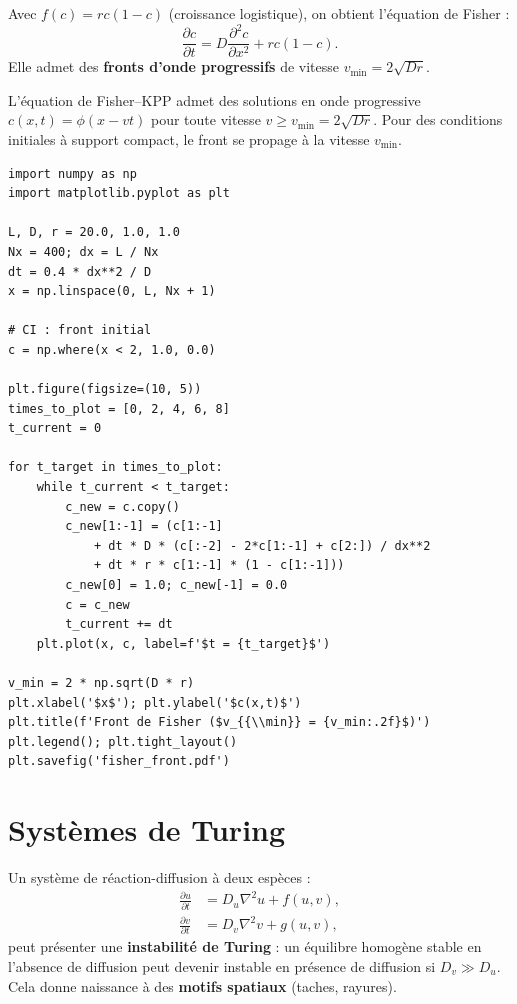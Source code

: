 \begin{exemple}
Avec $f(c)=rc(1-c)$ (croissance logistique), on obtient l'\'equation
de Fisher :
\[
  \frac{\partial c}{\partial t} = D\frac{\partial^2 c}{\partial x^2}
  + rc(1-c).
\]
Elle admet des \textbf{fronts d'onde progressifs} de vitesse
$v_{\min}=2\sqrt{Dr}$.
\end{exemple}

\begin{theoreme}
L'\'equation de Fisher--KPP admet des solutions en onde progressive
$c(x,t)=\phi(x-vt)$ pour toute vitesse $v\geq v_{\min}=2\sqrt{Dr}$.
Pour des conditions initiales \`a support compact, le front se propage
\`a la vitesse $v_{\min}$.
\end{theoreme}

\begin{codeblock}[title=\textbf{Front d'onde de Fisher}]
\begin{verbatim}
import numpy as np
import matplotlib.pyplot as plt

L, D, r = 20.0, 1.0, 1.0
Nx = 400; dx = L / Nx
dt = 0.4 * dx**2 / D
x = np.linspace(0, L, Nx + 1)

# CI : front initial
c = np.where(x < 2, 1.0, 0.0)

plt.figure(figsize=(10, 5))
times_to_plot = [0, 2, 4, 6, 8]
t_current = 0

for t_target in times_to_plot:
    while t_current < t_target:
        c_new = c.copy()
        c_new[1:-1] = (c[1:-1]
            + dt * D * (c[:-2] - 2*c[1:-1] + c[2:]) / dx**2
            + dt * r * c[1:-1] * (1 - c[1:-1]))
        c_new[0] = 1.0; c_new[-1] = 0.0
        c = c_new
        t_current += dt
    plt.plot(x, c, label=f'$t = {t_target}$')

v_min = 2 * np.sqrt(D * r)
plt.xlabel('$x$'); plt.ylabel('$c(x,t)$')
plt.title(f'Front de Fisher ($v_{{\\min}} = {v_min:.2f}$)')
plt.legend(); plt.tight_layout()
plt.savefig('fisher_front.pdf')
\end{verbatim}
\end{codeblock}

\section{Syst\`emes de Turing}

\begin{definition}
Un syst\`eme de r\'eaction-diffusion \`a deux esp\`eces :
\begin{align}
  \frac{\partial u}{\partial t} &= D_u\nabla^2 u + f(u,v), \\
  \frac{\partial v}{\partial t} &= D_v\nabla^2 v + g(u,v),
\end{align}
peut pr\'esenter une \textbf{instabilit\'e de Turing} : un \'equilibre
homog\`ene stable en l'absence de diffusion peut devenir instable en
pr\'esence de diffusion si $D_v \gg D_u$.  Cela donne naissance \`a
des \textbf{motifs spatiaux} (taches, rayures).
\end{definition}

